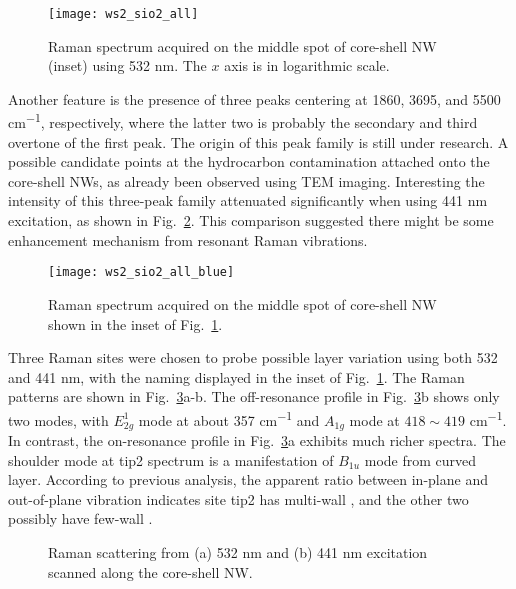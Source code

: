 \begin{figure}[htb]
\centering
\texttt{[image: ws2\_sio2\_all]}
\caption[Raman spectrum of - on -Si 1]{Raman spectrum acquired on the middle spot of core-shell NW (inset) using 532 nm. The $x$ axis is in logarithmic scale.}
\label{fig:ws2ramall}
\end{figure}

Another feature is the presence of three peaks centering at 1860, 3695, and 5500 \si{cm^{-1}}, respectively, where the latter two is probably the secondary and third overtone of the first peak. The origin of this peak family is still under research. A possible candidate points at the hydrocarbon contamination attached onto the core-shell NWs, as already been observed using TEM imaging. Interesting the intensity of this three-peak family attenuated significantly when using 441 nm excitation, as shown in Fig.~\ref{fig:ws2ramblue}. This comparison suggested there might be some enhancement mechanism from  resonant Raman vibrations. 

\begin{figure}[htb]
\centering
\texttt{[image: ws2\_sio2\_all\_blue]}
\caption[Raman spectrum of - on -Si 2]{Raman spectrum acquired on the middle spot of core-shell NW shown in the inset of Fig.~\ref{fig:ws2ramall}.}
\label{fig:ws2ramblue}
\end{figure}

Three Raman sites were chosen to probe possible layer variation using both 532 and 441 nm, with the naming displayed in the inset of Fig.~\ref{fig:ws2ramall}. The Raman patterns are shown in Fig.~\ref{fig:ws2ram3site}a-b. The off-resonance profile in Fig.~\ref{fig:ws2ram3site}b shows only two modes, with $E_{2g}^1$ mode at about 357 \si{cm^{-1}} and $A_{1g}$ mode at $418\sim419$ \si{cm^{-1}}. In contrast, the on-resonance profile in Fig.~\ref{fig:ws2ram3site}a exhibits much richer spectra. The shoulder mode at tip2 spectrum is a manifestation of $B_{1u}$ mode from curved  layer. According to previous analysis, the apparent ratio between in-plane and out-of-plane vibration indicates site tip2 has multi-wall , and the other two possibly have few-wall . 

\begin{figure}[htb]
\centering
{}\hspace{0.04\textwidth}
\caption[Raman spectrum of - on -Si 3]{Raman scattering from (a) 532 nm and (b) 441 nm excitation scanned along the core-shell NW.}
\label{fig:ws2ram3site}
\end{figure}

